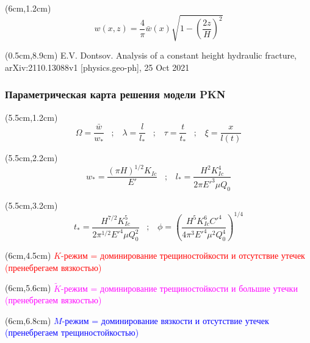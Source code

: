 \documentclass{beamer}
\begin{document}
\begin{frame}
\begin{textblock*}{7cm}(6cm,1.2cm)
\tiny
$$
w(x,z)=\frac{4}{\pi}\bar{w}(x)\sqrt{1-\left(\frac{2z}{H}\right)^2}
$$
\end{textblock*}

\begin{textblock*}{6cm}(0.5cm,8.9cm)
\tiny
\textcolor{lit_gray}{E.V. Dontsov. Analysis of a constant height hydraulic fracture, arXiv:2110.13088v1 [physics.geo-ph], 25 Oct 2021}
\end{textblock*}

\normalsize

\end{frame}


\begin{frame}
\frametitle{Параметрическая карта решения модели PKN}

\begin{textblock*}{7cm}(5.5cm,1.2cm)
\tiny
$$
\Omega=\frac{\bar{w}}{w_{*}}\,\,\,\,\,;\,\,\,\,\,\lambda=\frac{l}{l_{*}}\,\,\,\,\,;\,\,\,\,\,\tau=\frac{t}{t_{*}}\,\,\,\,\,;\,\,\,\,\,\xi=\frac{x}{l(t)}
$$
\normalsize
\end{textblock*}

\begin{textblock*}{7cm}(5.5cm,2.2cm)
\tiny
$$
w_{*}=\frac{\left(\pi H\right)^{1/2}K_{Ic}}{E'}\,\,\,\,\,;\,\,\,\,\,l_{*}=\frac{H^2K_{Ic}^4}{2\pi E'^3\mu Q_0}
$$
\normalsize
\end{textblock*}

\begin{textblock*}{7cm}(5.5cm,3.2cm)
\tiny
$$
t_{*}=\frac{H^{7/2}K_{Ic}^5}{2\pi^{1/2}E'^4\mu Q_0^2}\,\,\,\,\,;\,\,\,\,\,\phi=\left(\frac{H^5K_{Ic}^6C'^4}{4\pi^3E'^4\mu^2Q_0^4}\right)^{1/4}
$$
\normalsize
\end{textblock*}

\begin{textblock*}{6cm}(6cm,4.5cm)
\scriptsize
\textcolor{red}{
$K$-режим = доминирование трещиностойкости и отсутствие утечек (пренебрегаем вязкостью)
}
\normalsize
\end{textblock*}

\begin{textblock*}{6cm}(6cm,5.6cm)
\scriptsize
\textcolor{magenta}{
$\tilde{K}$-режим = доминирование трещиностойкости и большие утечки (пренебрегаем вязкостью)
}
\normalsize
\end{textblock*}

\begin{textblock*}{6.5cm}(6cm,6.8cm)
\scriptsize
\textcolor{blue}{
$M$-режим = доминирование вязкости и отсутствие утечек (пренебрегаем трещиностойкостью)
}
\normalsize
\end{textblock*}


\end{frame}
\end{document}
